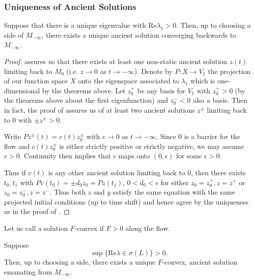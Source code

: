 \documentclass{amsart}
\begin{document}
\subsubsection{Uniqueness of Ancient Solutions}
\label{subsubsec:smooth_ancient_uniqueness}

\begin{thm}
Suppose that there is a unique eigenvalue with \(\text{Re} \lambda_1 > 0\). Then, up to choosing a side of \(M_{-\infty}\), there exists a unique ancient solution converging backwards to \(M_{-\infty}\). 
\end{thm}

\begin{proof}
\cite[Theorem 9.1.3]{lunardi2012analytic} assures us that there exists at least one non-static ancient solution \(z(t)\) limiting back to \(M_0\) (i.e. \(z \to 0\) as \(t \to -\infty\)). Denote by \(P : X \to V_1\) the projection of our function space \(X\) onto the eigenspace associated to \(\lambda_1\) which is one-dimensional by the theorems above. Let \(z_0^+\) be any basis for \(V_1\) with \(z_0^+ > 0\) (by the theorems above about the first eigenfunction) and \(z_0^- < 0\) also a basis. Then in fact, the proof of \cite[Theorem 9.1.3]{lunardi2012analytic} assures us of at least two ancient solutions \(z^{\pm}\) limiting back to \(0\) with \(\pm z^{\pm} > 0\).

Write \(P z^{\pm}(t) = c(t) z_0^{\pm}\) with \(c \to 0\) as \(t \to -\infty\). Since \(0\) is a barrier for the flow and \(c(t) z_0^{\pm}\) is either strictly positive or strictly negative, we may assume \(c > 0\). Continuity then implies that \(c\) maps onto \((0, \epsilon)\) for some \(\epsilon > 0\).

Thus if \(v(t)\) is any other ancient solution limiting back to \(0\), then there exists \(t_0,t_1\) with \(P v(t_0) = \pm d_0 z_0 = P z(t_1)\), \(0 < d_0 < \epsilon\) for either \(z_0 = z_0^+, z = z^+\) or \(z_0 = z_0^-, z = z^-\). Thus both \(z\) and \(y\) satisfy the same equation with the same projected initial conditions (up to time shift) and hence agree by the uniqueness as in the proof of \cite[Theorem 9.1.3]{lunardi2012analytic}.
\end{proof}

\begin{defn}
Let us call a solution \(F\)-convex if \(F > 0\) along the flow.
\end{defn}

\begin{thm}
Suppose
\[
\sup \{\text{Re}\lambda \in \sigma(L)\} > 0.
\]
Then, up to choosing a side, there exists a unique \(F\)-convex, ancient solution emanating from \(M_{-\infty}\).
\end{thm}
\end{document}
